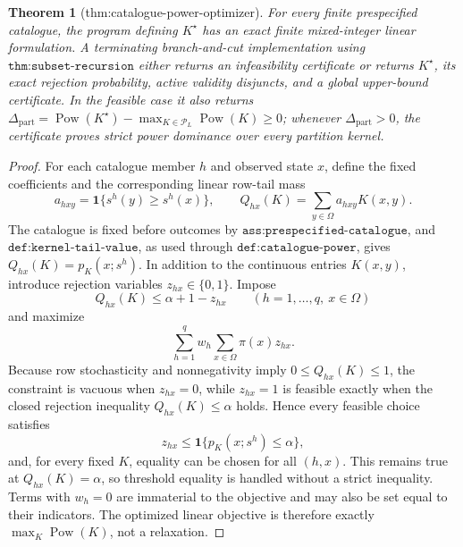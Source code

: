 \documentclass{article}
\newtheorem{theorem}{Theorem}
\begin{document}
\begin{theorem}[thm:catalogue-power-optimizer]\label{thm:catalogue-power-optimizer}
For every finite prespecified catalogue, the program defining \(K^{\star}\) has an exact finite mixed-integer linear formulation. A terminating branch-and-cut implementation using \(\texttt{thm:subset-recursion}\) either returns an infeasibility certificate or returns \(K^{\star}\), its exact rejection probability, active validity disjuncts, and a global upper-bound certificate. In the feasible case it also returns \(\Delta_{\mathrm{part}}=\operatorname{Pow}(K^{\star})-\max_{K\in\mathcal{P}_L}\operatorname{Pow}(K)\geq0\); whenever \(\Delta_{\mathrm{part}}>0\), the certificate proves strict power dominance over every partition kernel.
\end{theorem}
\begin{proof}
For each catalogue member \(h\) and observed state \(x\), define the fixed coefficients and the corresponding linear row-tail mass
\[
 a_{hxy}=\mathbf 1\{s^h(y)\geq s^h(x)\},
 \qquad
 Q_{hx}(K)=\sum_{y\in\Omega}a_{hxy}K(x,y).
\]
The catalogue is fixed before outcomes by \(\texttt{ass:prespecified-catalogue}\), and \(\texttt{def:kernel-tail-value}\), as used through \(\texttt{def:catalogue-power}\), gives \(Q_{hx}(K)=p_K(x;s^h)\).  In addition to the continuous entries \(K(x,y)\), introduce rejection variables \(z_{hx}\in\{0,1\}\).  Impose
\[
 Q_{hx}(K)\leq \alpha+1-z_{hx}
 \qquad(h=1,\ldots,q,\ x\in\Omega)
\]
and maximize
\[
 \sum_{h=1}^{q}w_h\sum_{x\in\Omega}\pi(x)z_{hx}.
\]
Because row stochasticity and nonnegativity imply \(0\leq Q_{hx}(K)\leq1\), the constraint is vacuous when \(z_{hx}=0\), while \(z_{hx}=1\) is feasible exactly when the closed rejection inequality \(Q_{hx}(K)\leq\alpha\) holds.  Hence every feasible choice satisfies
\[
 z_{hx}\leq\mathbf 1\{p_K(x;s^h)\leq\alpha\},
\]
and, for every fixed \(K\), equality can be chosen for all \((h,x)\).  This remains true at \(Q_{hx}(K)=\alpha\), so threshold equality is handled without a strict inequality.  Terms with \(w_h=0\) are immaterial to the objective and may also be set equal to their indicators.  The optimized linear objective is therefore exactly \(\max_K\operatorname{Pow}(K)\), not a relaxation.


\end{proof}
\end{document}

